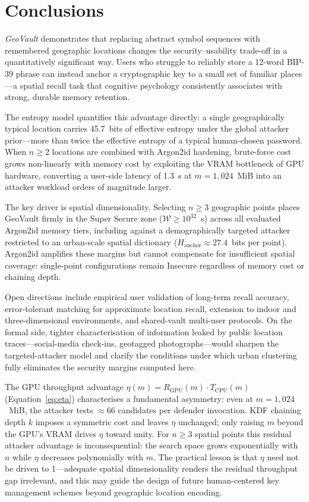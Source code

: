 \documentclass[journal,article,accept,pdftex,moreauthors]{Definitions/mdpi}
\begin{document}
\section{Conclusions}

\textit{GeoVault} demonstrates that replacing abstract symbol sequences with remembered geographic locations changes the security--usability trade-off in a quantitatively significant way. Users who struggle to reliably store a 12-word BIP-39 phrase can instead anchor a cryptographic key to a small set of familiar places---a spatial recall task that cognitive psychology consistently associates with strong, durable memory retention.

The entropy model quantifies this advantage directly: a single geographically typical location carries 45.7~bits of effective entropy under the global attacker prior---more than twice the effective entropy of a typical human-chosen password. When $n \geq 2$ locations are combined with Argon2id hardening, brute-force cost grows non-linearly with memory cost by exploiting the VRAM bottleneck of GPU hardware, converting a user-side latency of 1.3~s at $m=1{,}024$~MiB into an attacker workload orders of magnitude larger.

The key driver is spatial dimensionality. Selecting $n \geq 3$ geographic points places GeoVault firmly in the Super Secure zone ($\mathcal{W} \geq 10^{32}$~s) across all evaluated Argon2id memory tiers, including against a demographically targeted attacker restricted to an urban-scale spatial dictionary ($H_\text{anchor} \approx 27.4$~bits per point). Argon2id amplifies these margins but cannot compensate for insufficient spatial coverage: single-point configurations remain Insecure regardless of memory cost or chaining depth.

Open directions include empirical user validation of long-term recall accuracy, error-tolerant matching for approximate location recall, extension to indoor and three-dimensional environments, and shared-vault multi-user protocols. On the formal side, tighter characterisation of information leaked by public location traces---social-media check-ins, geotagged photographs---would sharpen the targeted-attacker model and clarify the conditions under which urban clustering fully eliminates the security margins computed here.

The GPU throughput advantage $\eta(m) = R_\text{GPU}(m)\cdot T_\text{CPU}(m)$ (Equation~\ref{eq:eta}) characterises a fundamental asymmetry: even at $m=1{,}024$~MiB, the attacker tests $\approx$66 candidates per defender invocation. KDF chaining depth $k$ imposes a symmetric cost and leaves $\eta$ unchanged; only raising $m$ beyond the GPU's VRAM drives $\eta$ toward unity. For $n \geq 3$ spatial points this residual attacker advantage is inconsequential: the search space grows exponentially with $n$ while $\eta$ decreases polynomially with $m$. The practical lesson is that $\eta$ need not be driven to 1---adequate spatial dimensionality renders the residual throughput gap irrelevant, and this may guide the design of future human-centered key management schemes beyond geographic location encoding.
\end{document}
